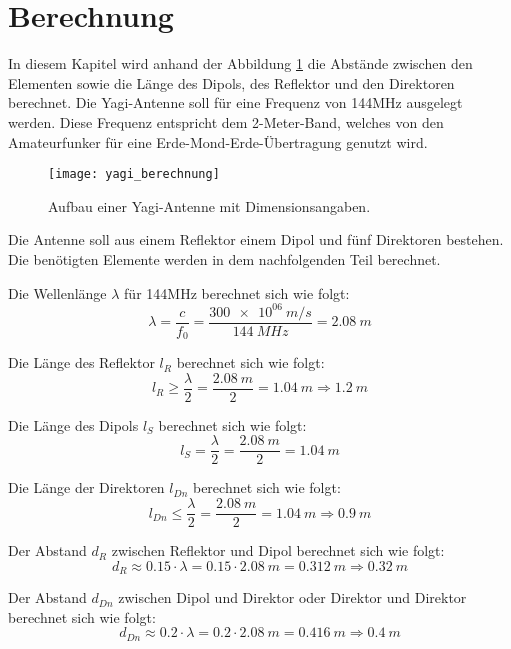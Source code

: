 \section{Berechnung}
In diesem Kapitel wird anhand der Abbildung \ref{fig:berechnung} die Abstände zwischen den Elementen sowie die Länge des Dipols, des Reflektor und den Direktoren berechnet. Die Yagi-Antenne soll für eine Frequenz von 144MHz ausgelegt werden. Diese Frequenz entspricht dem 2-Meter-Band, welches von den Amateurfunker für eine Erde-Mond-Erde-Übertragung genutzt wird. 

\begin{figure}[H]
	\centering
	\texttt{[image: yagi\_berechnung]}
	\caption{Aufbau einer Yagi-Antenne mit Dimensionsangaben.}\label{fig:berechnung}
\end{figure}

Die Antenne soll aus einem Reflektor einem Dipol und fünf Direktoren bestehen. Die benötigten Elemente werden in dem nachfolgenden Teil berechnet.

Die Wellenlänge $ \lambda $ für 144MHz berechnet sich wie folgt:
\begin{equation}
\lambda=\frac{c}{f_{0}}=\frac{\SI{300e06}{m/s}}{
\SI{144}{MHz}} = \SI{2.08}{m}
\end{equation}

Die Länge des Reflektor $ l_{R} $ berechnet sich wie folgt:
\begin{equation}
l_{R}\geq\frac{\lambda}{2}=\frac{\SI{2.08}{m}}{
	2} = \SI{1.04}{m} \Rightarrow \SI{1.2}{m}
\end{equation}

Die Länge des Dipols $ l_{S} $ berechnet sich wie folgt:
\begin{equation}
l_{S}=\frac{\lambda}{2}=\frac{\SI{2.08}{m}}{
	2} = \SI{1.04}{m}
\end{equation}

Die Länge der Direktoren $ l_{Dn} $ berechnet sich wie folgt:
\begin{equation}
l_{Dn}\leq\frac{\lambda}{2}=\frac{\SI{2.08}{m}}{
	2} = \SI{1.04}{m} \Rightarrow \SI{0.9}{m}
\end{equation}

Der Abstand $ d_{R} $ zwischen Reflektor und Dipol berechnet sich wie folgt:
\begin{equation}
d_{R}\approx 0.15\cdot\lambda=0.15\cdot \SI{2.08}{m}= \SI{0.312}{m}\Rightarrow \SI{0.32}{m}
\end{equation}

Der Abstand $ d_{Dn} $ zwischen Dipol und Direktor oder Direktor und Direktor berechnet sich wie folgt:
\begin{equation}
d_{Dn}\approx 0.2\cdot\lambda=0.2\cdot \SI{2.08}{m}= \SI{0.416}{m} \Rightarrow \SI{0.4}{m}
\end{equation}

